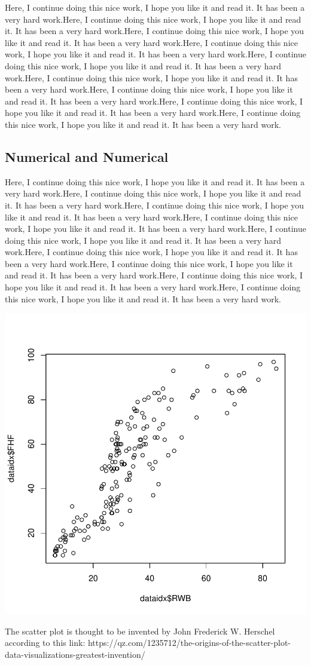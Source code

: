 \documentclass[11pt]{article}
\begin{document}
Here, I continue doing this nice work, I hope you like it and read it. It has been a very hard work.Here, I continue doing this nice work, I hope you like it and read it. It has been a very hard work.Here, I continue doing this nice work, I hope you like it and read it. It has been a very hard work.Here, I continue doing this nice work, I hope you like it and read it. It has been a very hard work.Here, I continue doing this nice work, I hope you like it and read it. It has been a very hard work.Here, I continue doing this nice work, I hope you like it and read it. It has been a very hard work.Here, I continue doing this nice work, I hope you like it and read it. It has been a very hard work.Here, I continue doing this nice work, I hope you like it and read it. It has been a very hard work.Here, I continue doing this nice work, I hope you like it and read it. It has been a very hard work.

\subsection{Numerical and Numerical}\label{binumnum}

Here, I continue doing this nice work, I hope you like it and read it. It has been a very hard work.Here, I continue doing this nice work, I hope you like it and read it. It has been a very hard work.Here, I continue doing this nice work, I hope you like it and read it. It has been a very hard work.Here, I continue doing this nice work, I hope you like it and read it. It has been a very hard work.Here, I continue doing this nice work, I hope you like it and read it. It has been a very hard work.Here, I continue doing this nice work, I hope you like it and read it. It has been a very hard work.Here, I continue doing this nice work, I hope you like it and read it. It has been a very hard work.Here, I continue doing this nice work, I hope you like it and read it. It has been a very hard work.Here, I continue doing this nice work, I hope you like it and read it. It has been a very hard work.

\includegraphics{PaperInR_3-numnum_plot}

The scatter plot is thought to be invented by  John Frederick W. Herschel according to this link: https://qz.com/1235712/the-origins-of-the-scatter-plot-data-visualizations-greatest-invention/
\end{document}
